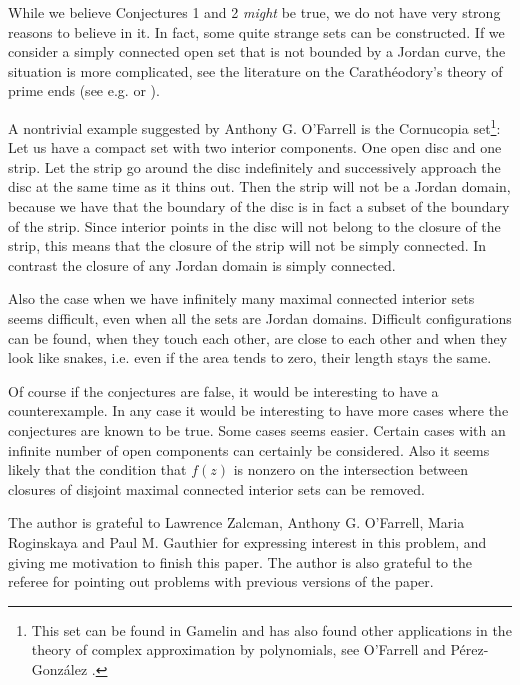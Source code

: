 \documentclass[11pt]{article}
\begin{document}
While we believe Conjectures 1 and 2 {\em might} be true, we do not have very strong reasons to believe in it. In fact, some quite strange sets can be constructed. If we consider a simply connected open set that is not bounded by a Jordan curve, the situation is more complicated, see the literature on the Carath{\'e}odory's theory of prime ends (see e.g. \cite{Cara} or \cite{Epstein}). 


A nontrivial example suggested by Anthony G. O'Farrell is the Cornucopia set\footnote{This set can be found in Gamelin \cite{Gamelin} and has also found other applications in the theory of complex approximation by polynomials, see O'Farrell and  P{\'e}rez-Gonz{\'a}lez \cite{Farrell}.}: Let us have a compact set with two interior components. One open disc and one strip. Let the strip go around the disc indefinitely and successively approach the disc at the same time as it thins out.  Then the strip will not be a Jordan domain, because we have that the boundary of the disc is in fact a subset of the boundary of the strip. Since interior points in the disc will not belong to the closure of the strip, this means that the closure of the strip will not be simply connected.  In contrast the closure of any Jordan domain is simply connected. 


Also the case when we have infinitely many maximal connected interior sets seems difficult, even when all the sets are Jordan domains.  Difficult configurations can be found, when they touch each other, are close to each other and when they look like snakes, i.e. even if the area tends to zero, their length stays the same.  

Of course if the conjectures are false, it would be interesting to have a counterexample.  In any case it would be interesting to have more cases where the conjectures are known to be true. Some cases seems easier. Certain cases with an infinite number of open components can certainly be considered. Also it seems likely that the condition that $f(z)$ is nonzero on the intersection between closures of disjoint maximal connected interior sets can be removed.



\begin{ack}
 The author is grateful to Lawrence Zalcman, Anthony G. O'Farrell, Maria Roginskaya and Paul M. Gauthier for expressing interest in this problem, and giving me motivation to finish this paper. The author is also grateful to the referee for pointing out  problems with previous versions of the paper.
\end{ack}
\end{document}
